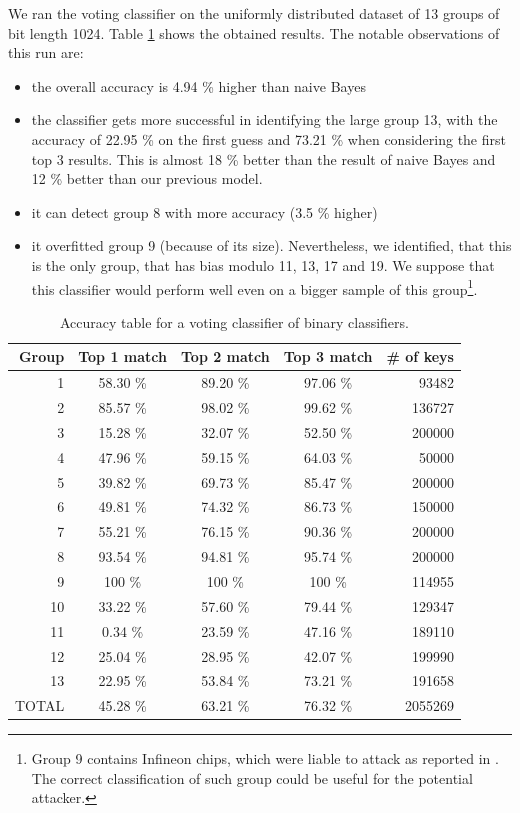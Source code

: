 We ran the voting classifier on the uniformly distributed dataset of 13 groups of bit length 1024. Table \ref{table-binary-voter} shows the obtained results. The notable observations of this run are:

\begin{itemize}

\item the overall accuracy is 4.94 \% higher than naive Bayes
\item the classifier gets more successful in identifying the large group 13, with the accuracy of 22.95 \% on the first guess and 73.21 \% when considering the first top 3 results. This is almost 18 \% better than the result of naive Bayes and 12 \% better than our previous model.
\item it can detect group 8 with more accuracy (3.5 \% higher)
\item it overfitted group 9 (because of its size). Nevertheless, we identified, that this is the only group, that has bias modulo 11, 13, 17 and 19. We suppose that this classifier would perform well even on a bigger sample of this group\footnote{Group 9 contains Infineon chips, which were liable to attack as reported in \cite{svenda_2}. The correct classification of such group could be useful for the potential attacker.}. 

\end{itemize}

\begin{table}[h]
\centering
\begin{tabular}{| r | c | c | c | r | }
\hline
  Group & Top 1 match & Top 2 match & Top 3 match & \# of keys \\
  \hline
 1 & 58.30 \% & 89.20 \% & 97.06 \% & 93482 \\
 2 & 85.57 \% & 98.02 \% & 99.62 \% & 136727 \\
 3 & 15.28 \% & 32.07 \% & 52.50 \% & 200000 \\
 4 & 47.96 \% & 59.15 \% & 64.03 \% & 50000 \\
 5 & 39.82 \% & 69.73 \% & 85.47 \% & 200000 \\
 6 & 49.81 \% & 74.32 \% & 86.73 \% & 150000 \\
 7 & 55.21 \% & 76.15 \% & 90.36 \% & 200000 \\
 8 & 93.54 \% & 94.81 \% & 95.74 \% & 200000 \\
 9 & 100 \% & 100 \% & 100 \% & 114955 \\
 10 & 33.22 \% & 57.60 \% & 79.44 \% & 129347 \\
 11 & 0.34 \% & 23.59 \% & 47.16 \% & 189110 \\
 12 & 25.04 \% & 28.95 \% & 42.07 \% & 199990 \\
 13 & 22.95 \% & 53.84 \% & 73.21 \% & 191658 \\
 \hline
TOTAL & 45.28 \% & 63.21 \% & 76.32 \% & 2055269 \\
\hline

\end{tabular}
\caption{Accuracy table for a voting classifier of binary classifiers.}
\label{table-binary-voter}
\end{table}

